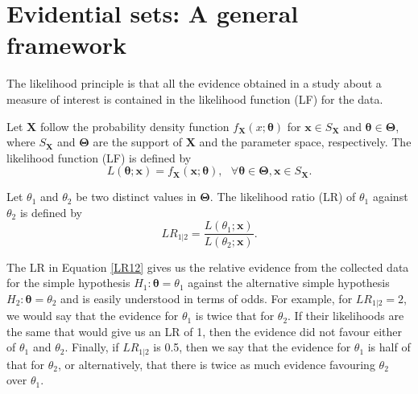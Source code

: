 \documentclass[twoside]{article}
\begin{document}
\section{Evidential sets: A general framework}
The likelihood principle is that all the evidence obtained in a study about a measure of interest is contained in the likelihood function (LF) for the data. 
\begin{dfn} 
Let $\mathbf{X}$ follow the probability density function $f_\mathbf{X}(x; \mathbf{\theta})$ for $\mathbf{x}\in S_\mathbf{X}$ and $\mathbf{\theta}\in\mathbf{\Theta}$, where $S_\mathbf{X}$ and $\mathbf{\Theta}$ are the support of $\mathbf{X}$ and the parameter space, respectively. The likelihood function (LF) is defined by
\begin{equation} \label{Likely}
L(\mathbf{\theta}; \mathbf{x})=f_\mathbf{X}(\mathbf{x};\mathbf{\theta}), \ \ \ \forall\mathbf{\theta}\in\mathbf{\Theta},\mathbf{x}\in S_\mathbf{X}.
\end{equation}
\end{dfn}

\begin{dfn} Let $\theta_1$ and $\theta_2$ be two distinct values in $\mathbf{\Theta}$. The likelihood ratio (LR) of $\theta_1$ against $\theta_2$ is defined by
\begin{equation} \label{LR12}
LR_{1|2}=\frac{L(\theta_1; \mathbf{x})}{L(\theta_2; \mathbf{x})}.
\end{equation}
\end{dfn}
The LR in Equation \eqref{LR12} gives us the relative evidence from the collected data for the simple hypothesis $H_1:\mathbf{\theta}=\theta_1$ against the alternative simple hypothesis $H_2:\mathbf{\theta}=\theta_2$ and is easily understood in terms of odds. 
For example, for $LR_{1|2}=2$, we would say that the evidence for $\theta_{1}$ is twice that for $\theta_{2}$. If their likelihoods are the same that would give us an LR of 1, then the evidence did not favour either of $\theta_1$ and $\theta_2$. Finally, if $LR_{1|2}$ is 0.5, then we say that the evidence for $\theta_{1}$ is half of that for $\theta_{2}$, or alternatively, that there is twice as much evidence favouring $\theta_{2}$ over $\theta_{1}$.
\end{document}
